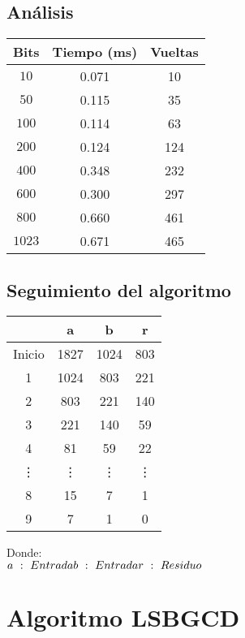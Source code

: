 \documentclass[11pt, conference]{IEEEtran}
\begin{document}
\subsection{Análisis}
\begin{center}
	\begin{tabular}{|c|c|c|}
		\hline
		\textbf{Bits}& {\bf Tiempo} (ms) & {\bf Vueltas} \\	\hline
		$10$ & 0.071 & 10\\ \hline
		$50$ & 0.115 & 35 \\ \hline
		$100$ & 0.114 & 63 \\ \hline
		$200$ & 0.124 & 124 \\ \hline
		$400$ & 0.348 & 232 \\ \hline
		$600$ & 0.300 & 297 \\ \hline
		$800$ & 0.660 & 461 \\ \hline
		$1023$ & 0.671 & 465 \\ \hline
	\end{tabular}
\end{center}
\subsection{Seguimiento del algoritmo}

\begin{center}
	\begin{tabular}{|c|c|c|c|}
		\hline
		& \textbf{a}& \textbf{b} & \textbf{r} \\	\hline
		Inicio & 1827 & 1024 & 803\\ \hline
		1 & 1024 & 803 & 221\\ \hline
		2 & 803 & 221 & 140\\ \hline
		3 & 221 & 140 & 59\\ \hline
		4 & 81 & 59 & 22\\ \hline
		\vdots & \vdots & \vdots & \vdots \\ \hline
		8 & 15 & 7 & 1\\ \hline
		9 & 7 & 1 & 0\\ \hline
	\end{tabular}
\end{center}
Donde:\\
$
a\ :\ Entrada \\
b\ :\ Entrada \\
r\ :\ Residuo \\
$

\section{Algoritmo LSBGCD}
\end{document}
